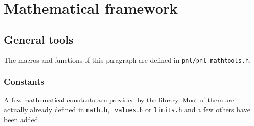 \section{Mathematical framework}

\subsection{General tools}

The macros and functions of this paragraph are defined in \verb!pnl/pnl_mathtools.h!.

\subsubsection{Constants} A few mathematical constants are provided by the
library. Most of them are actually already defined in {\tt math.h}, {\tt
  values.h} or {\tt limits.h} and a few others have been added.
\begin{describeconst}
\end{describeconst}

